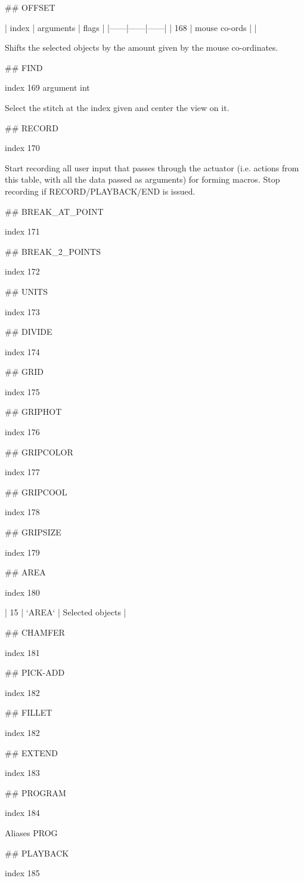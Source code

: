 ## OFFSET

| index | arguments | flags |
|------|------|------|
| 168 | mouse co-ords | |

Shifts the selected objects by the amount given by the mouse co-ordinates.

## FIND

index 169 argument int

Select the stitch at the index given and center the view on it.

## RECORD

index 170

Start recording all user input that passes through the actuator (i.e. actions
from this table, with all the data passed as arguments) for forming macros. Stop
recording if RECORD/PLAYBACK/END is issued.

## BREAK_AT_POINT

index 171

## BREAK_2_POINTS

index 172

## UNITS

index 173

## DIVIDE

index 174

## GRID

index 175

## GRIPHOT

index 176

## GRIPCOLOR

index 177

## GRIPCOOL

index 178

## GRIPSIZE

index 179

## AREA

index 180

| 15 | `AREA` | Selected objects |

## CHAMFER

index 181

## PICK-ADD

index 182

## FILLET

index 182

## EXTEND

index 183

## PROGRAM

index 184

Aliases PROG

## PLAYBACK

index 185

